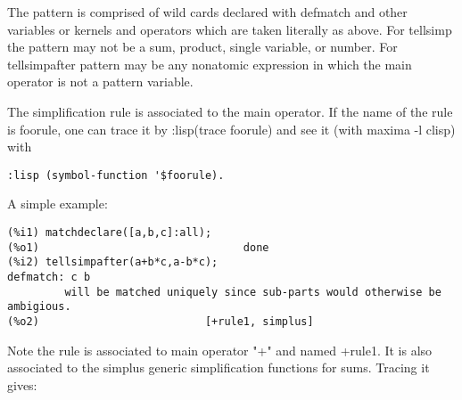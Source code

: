 \documentclass[a4paper,11pt]{article}
\begin{document}
The pattern is comprised of wild cards declared with defmatch and
other variables or kernels and operators which are taken literally as
above.  For tellsimp the pattern may not be a sum, product, single
variable, or number. For tellsimpafter pattern may be any nonatomic
expression in which the main operator is not a pattern variable.

The simplification rule is associated to the main operator. If the
name of the rule is foorule, one can trace it by :lisp(trace foorule)
and see it (with maxima -l clisp) with 
\begin{verbatim}
:lisp (symbol-function '$foorule). 
\end{verbatim}
A simple example:
\begin{verbatim}
(%i1) matchdeclare([a,b,c]:all);
(%o1)                                done
(%i2) tellsimpafter(a+b*c,a-b*c);
defmatch: c b
         will be matched uniquely since sub-parts would otherwise be ambigious.
(%o2)                          [+rule1, simplus]
\end{verbatim}
Note the rule is associated to main operator "+" and named +rule1.  It
is also associated to the simplus generic simplification functions for
sums. Tracing it gives:
\end{document}
